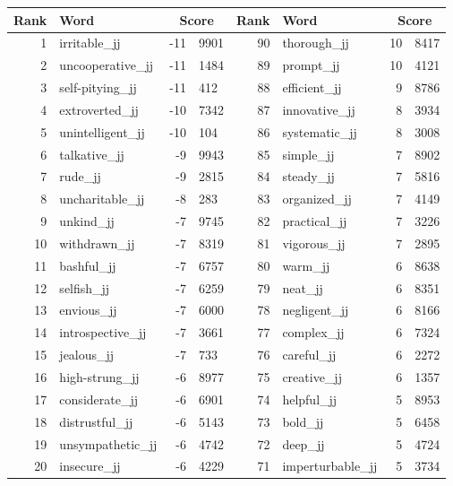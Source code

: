 \begin{table}[tbp]
    \begin{tabular}{| rlr@{.}l | rlr@{.}l |}
    \hline
    \textbf{Rank} & \textbf{Word} & \multicolumn{2}{c|}{\textbf{Score}} & \textbf{Rank} & \textbf{Word} & \multicolumn{2}{c|}{\textbf{Score}} \\
    \hline
    1 & irritable\_jj & -11 & 9901    &    90 & thorough\_jj & 10 & 8417 \\
    2 & uncooperative\_jj & -11 & 1484    &    89 & prompt\_jj & 10 & 4121 \\
    3 & self-pitying\_jj & -11 & 412    &    88 & efficient\_jj & 9 & 8786 \\
    4 & extroverted\_jj & -10 & 7342    &    87 & innovative\_jj & 8 & 3934 \\
    5 & unintelligent\_jj & -10 & 104    &    86 & systematic\_jj & 8 & 3008 \\
    6 & talkative\_jj & -9 & 9943    &    85 & simple\_jj & 7 & 8902 \\
    7 & rude\_jj & -9 & 2815    &    84 & steady\_jj & 7 & 5816 \\
    8 & uncharitable\_jj & -8 & 283    &    83 & organized\_jj & 7 & 4149 \\
    9 & unkind\_jj & -7 & 9745    &    82 & practical\_jj & 7 & 3226 \\
    10 & withdrawn\_jj & -7 & 8319    &    81 & vigorous\_jj & 7 & 2895 \\
    11 & bashful\_jj & -7 & 6757    &    80 & warm\_jj & 6 & 8638 \\
    12 & selfish\_jj & -7 & 6259    &    79 & neat\_jj & 6 & 8351 \\
    13 & envious\_jj & -7 & 6000    &    78 & negligent\_jj & 6 & 8166 \\
    14 & introspective\_jj & -7 & 3661    &    77 & complex\_jj & 6 & 7324 \\
    15 & jealous\_jj & -7 & 733    &    76 & careful\_jj & 6 & 2272 \\
    16 & high-strung\_jj & -6 & 8977    &    75 & creative\_jj & 6 & 1357 \\
    17 & considerate\_jj & -6 & 6901    &    74 & helpful\_jj & 5 & 8953 \\
    18 & distrustful\_jj & -6 & 5143    &    73 & bold\_jj & 5 & 6458 \\
    19 & unsympathetic\_jj & -6 & 4742    &    72 & deep\_jj & 5 & 4724 \\
    20 & insecure\_jj & -6 & 4229    &    71 & imperturbable\_jj & 5 & 3734 \\

\end{tabular}
\end{table}
